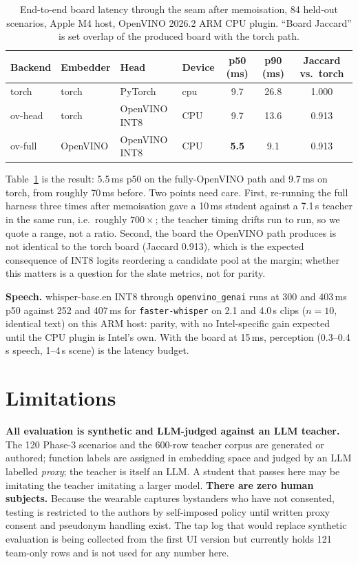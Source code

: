 \begin{table}[t]
\centering
\small
\caption{End-to-end board latency through the seam after memoisation, 84
held-out scenarios, Apple M4 host, OpenVINO 2026.2 ARM CPU plugin. ``Board
Jaccard'' is set overlap of the produced board with the torch path.}
\label{tab:latency}
\begin{tabular}{llllccc}
\toprule
\textbf{Backend} & \textbf{Embedder} & \textbf{Head} & \textbf{Device} & \textbf{p50 (ms)} & \textbf{p90 (ms)} & \textbf{Jaccard vs.\ torch} \\
\midrule
torch   & torch    & PyTorch        & cpu & 9.7 & 26.8 & 1.000 \\
ov-head & torch    & OpenVINO INT8  & CPU & 9.7 & 13.6 & 0.913 \\
ov-full & OpenVINO & OpenVINO INT8  & CPU & \textbf{5.5} & 9.1 & 0.913 \\
\bottomrule
\end{tabular}
\end{table}

Table~\ref{tab:latency} is the result: 5.5\,ms p50 on the fully-OpenVINO path
and 9.7\,ms on torch, from roughly 70\,ms before. Two points need care.
First, re-running the full harness three times after memoisation gave a
10\,ms student against a 7.1\,s teacher in the same run, i.e.\ roughly $700\times$; the teacher
timing drifts run to run, so we quote a range, not a ratio. Second, the board the
OpenVINO path produces is not identical to the torch board (Jaccard 0.913),
which is the expected consequence of INT8 logits reordering a candidate pool at
the margin; whether this matters is a question for the slate metrics, not for
parity.

\textbf{Speech.} whisper-base.en INT8 through \texttt{openvino\_genai} runs
at 300 and 403\,ms p50 against 252 and 407\,ms for \texttt{faster-whisper}
on 2.1 and 4.0\,s clips ($n{=}10$, identical text) on this ARM host: parity,
with no Intel-specific gain expected until the CPU plugin is Intel's own. With
the board at 15\,ms, perception (0.3--0.4\,s speech, 1--4\,s scene) is the
latency budget.

\section{Limitations}\label{sec:limits}

\textbf{All evaluation is synthetic and LLM-judged against an LLM teacher.}
The 120 Phase-3 scenarios and the 600-row teacher corpus are generated or
authored; function labels are assigned in embedding space and judged by an LLM
labelled \emph{proxy}; the teacher is itself an LLM. A student that passes here
may be imitating the teacher imitating a larger model. \textbf{There are zero
human subjects.} Because the wearable captures bystanders who have not
consented, testing is restricted to the authors by self-imposed policy until
written proxy consent and pseudonym handling exist. The tap log that would
replace synthetic evaluation is being collected from the first UI version but
currently holds 121 team-only rows and is not used for any number here.


